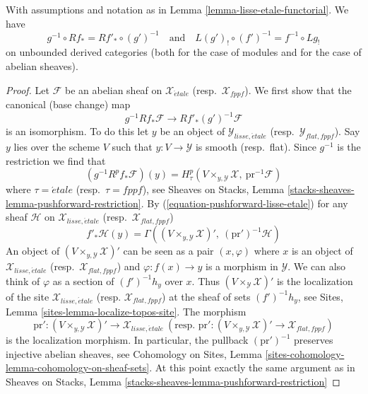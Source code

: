 \begin{lemma}
\label{lemma-lisse-etale-functorial-derived}
With assumptions and notation as in
Lemma \ref{lemma-lisse-etale-functorial}.
We have
$$
g^{-1} \circ Rf_* = Rf'_* \circ (g')^{-1}
\quad\text{and}\quad
L(g')_! \circ (f')^{-1} = f^{-1} \circ Lg_!
$$
on unbounded derived categories
(both for the case of modules and for the case of abelian sheaves).
\end{lemma}

\begin{proof}
Let $\mathcal{F}$ be an abelian sheaf on $\mathcal{X}_{\acute{e}tale}$
(resp.\ $\mathcal{X}_{fppf}$). We first show that the canonical
(base change) map
$$
g^{-1} Rf_*\mathcal{F} \longrightarrow Rf'_* (g')^{-1}\mathcal{F}
$$
is an isomorphism. To do this let $y$ be an object of
$\mathcal{Y}_{lisse,\acute{e}tale}$ (resp.\ $\mathcal{Y}_{flat,fppf}$).
Say $y$ lies over the scheme $V$ such that $y : V \to \mathcal{Y}$ is
smooth (resp.\ flat). Since $g^{-1}$ is the restriction we find that
$$
\left(g^{-1}R^pf_*\mathcal{F}\right)(y) =
H^p_\tau(V \times_{y, \mathcal{Y}} \mathcal{X},\ \text{pr}^{-1}\mathcal{F})
$$
where $\tau = \acute{e}tale$ (resp.\ $\tau = fppf$), see 
Sheaves on Stacks, Lemma \ref{stacks-sheaves-lemma-pushforward-restriction}.
By (\ref{equation-pushforward-lisse-etale}) 
for any sheaf $\mathcal{H}$ on
$\mathcal{X}_{lisse,\acute{e}tale}$ (resp.\ $\mathcal{X}_{flat,fppf}$)
$$
f'_*\mathcal{H}(y) =
\Gamma((V \times_{y, \mathcal{Y}} \mathcal{X})',
\ (\text{pr}')^{-1}\mathcal{H})
$$
An object of $(V \times_{y, \mathcal{Y}} \mathcal{X})'$ can be seen
as a pair $(x, \varphi)$ where $x$ is an object of
$\mathcal{X}_{lisse,\acute{e}tale}$ (resp.\ $\mathcal{X}_{flat,fppf}$)
and $\varphi : f(x) \to y$ is a morphism in $\mathcal{Y}$.
We can also think of $\varphi$ as a section of $(f')^{-1}h_y$ over $x$.
Thus $(V \times_\mathcal{Y} \mathcal{X})'$ is the localization
of the site $\mathcal{X}_{lisse,\acute{e}tale}$
(resp. $\mathcal{X}_{flat,fppf}$) at the sheaf of sets $(f')^{-1}h_y$, see
Sites, Lemma \ref{sites-lemma-localize-topos-site}. The morphism
$$
\text{pr}' : (V \times_{y, \mathcal{Y}} \mathcal{X})'
\to \mathcal{X}_{lisse,\acute{e}tale}
\ (\text{resp. }
\text{pr}' : (V \times_{y, \mathcal{Y}} \mathcal{X})'
\to \mathcal{X}_{flat,fppf})
$$
is the localization morphism.
In particular, the pullback $(\text{pr}')^{-1}$ preserves
injective abelian sheaves, see
Cohomology on Sites, Lemma
\ref{sites-cohomology-lemma-cohomology-on-sheaf-sets}.
At this point exactly the same argument as in
Sheaves on Stacks, Lemma \ref{stacks-sheaves-lemma-pushforward-restriction}

\end{proof}
